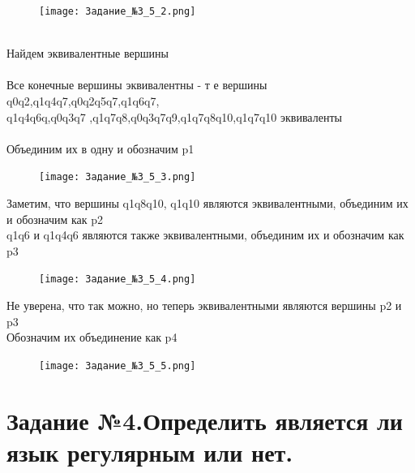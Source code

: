 \documentclass[a4paper]{article}
\begin{document}
\begin{enumerate}
\begin{figure}[h]
\centering
\texttt{[image: Задание\_№3\_5\_2.png]}
\end{figure}
\\Найдем эквивалентные вершины\\
\\Все конечные вершины эквивалентны - т е вершины q0q2,q1q4q7,q0q2q5q7,q1q6q7,\\q1q4q6q,q0q3q7
,q1q7q8,q0q3q7q9,q1q7q8q10,q1q7q10 эквиваленты\\
\\Объединим их в одну и обозначим p1\\
\begin{figure}[h]
\centering
\texttt{[image: Задание\_№3\_5\_3.png]}
\end{figure}
\hfill \break
Заметим, что вершины q1q8q10, q1q10 являются эквивалентными, объединим их и обозначим как p2\\
q1q6 и q1q4q6 являются также эквивалентными, объединим их и обозначим как p3\\
\begin{figure}[h]
\centering
\texttt{[image: Задание\_№3\_5\_4.png]}
\end{figure}
\newpage
Не уверена, что так можно, но теперь эквивалентными являются вершины p2 и p3\\
Обозначим их объединение как p4\\

\begin{figure}[h]
\centering
\texttt{[image: Задание\_№3\_5\_5.png]}
\end{figure}

\end{enumerate}
\newpage


\newpage
\section{Задание №4.Определить является ли язык регулярным или нет.}
\newpage
\end{document}
